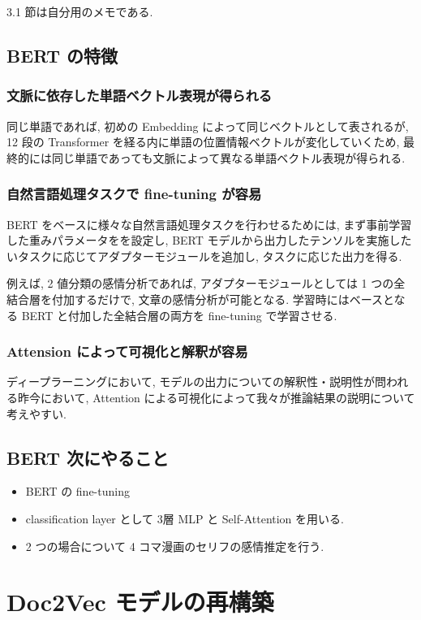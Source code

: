 \documentclass[twocolumn]{jarticle}     %
\begin{document}
3.1 節は自分用のメモである.

\subsection{BERT の特徴}
\subsubsection{文脈に依存した単語ベクトル表現が得られる}
同じ単語であれば, 初めの Embedding によって同じベクトルとして表されるが, 12 段の Transformer を経る内に単語の位置情報ベクトルが変化していくため, 最終的には同じ単語であっても文脈によって異なる単語ベクトル表現が得られる.
\subsubsection{自然言語処理タスクで fine-tuning が容易}
BERT をベースに様々な自然言語処理タスクを行わせるためには, まず事前学習した重みパラメータをを設定し, BERT モデルから出力したテンソルを実施したいタスクに応じてアダプターモジュールを追加し, タスクに応じた出力を得る.

例えば, 2 値分類の感情分析であれば, アダプターモジュールとしては 1 つの全結合層を付加するだけで, 文章の感情分析が可能となる. 学習時にはベースとなる BERT と付加した全結合層の両方を fine-tuning で学習させる.
\subsubsection{Attension によって可視化と解釈が容易}
ディープラーニングにおいて, モデルの出力についての解釈性・説明性が問われる昨今において, Attention による可視化によって我々が推論結果の説明について考えやすい.

\subsection{BERT 次にやること}
\begin{itemize}
  \item BERT の fine-tuning
  \item classification layer として 3層 MLP と Self-Attention を用いる.
  \item 2 つの場合について 4 コマ漫画のセリフの感情推定を行う.
\end{itemize}


\section{Doc2Vec モデルの再構築}
\end{document}

